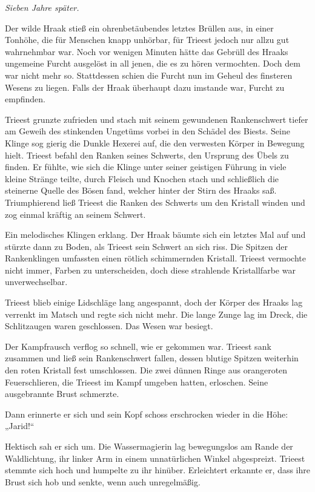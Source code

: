 
\textit{Sieben Jahre später.}\bigskip



Der wilde Hraak stieß ein ohrenbetäubendes letztes Brüllen aus, in einer Tonhöhe, die für Menschen knapp unhörbar, für Trieest jedoch nur allzu gut wahrnehmbar war. Noch vor wenigen Minuten hätte das Gebrüll des Hraaks ungemeine Furcht ausgelöst in all jenen, die es zu hören vermochten. Doch dem war nicht mehr so. Stattdessen schien die Furcht nun im Geheul des finsteren Wesens zu liegen. Falls der Hraak überhaupt dazu imstande war, Furcht zu empfinden.

Trieest grunzte zufrieden und stach mit seinem gewundenen Rankenschwert tiefer am Geweih des stinkenden Ungetüms vorbei in den Schädel des Biests. Seine Klinge sog gierig die Dunkle Hexerei auf, die den verwesten Körper in Bewegung hielt. Trieest befahl den Ranken seines Schwerts, den Ursprung des Übels zu finden. Er fühlte, wie sich die Klinge unter seiner geistigen Führung in viele kleine Stränge teilte, durch Fleisch und Knochen stach und schließlich die steinerne Quelle des Bösen fand, welcher hinter der Stirn des Hraaks saß. Triumphierend ließ Trieest die Ranken des Schwerts um den Kristall winden und zog einmal kräftig an seinem Schwert.

Ein melodisches Klingen erklang. Der Hraak bäumte sich ein letztes Mal auf und stürzte dann zu Boden, als Trieest sein Schwert an sich riss. Die Spitzen der Rankenklingen umfassten einen rötlich schimmernden Kristall. Trieest vermochte nicht immer, Farben zu unterscheiden, doch diese strahlende Kristallfarbe war unverwechselbar.

Trieest blieb einige Lidschläge lang angespannt, doch der Körper des Hraaks lag verrenkt im Matsch und regte sich nicht mehr. Die lange Zunge lag im Dreck, die Schlitzaugen waren geschlossen. Das Wesen war besiegt.

Der Kampfrausch verflog so schnell, wie er gekommen war. Trieest sank zusammen und ließ sein Rankenschwert fallen, dessen blutige Spitzen weiterhin den roten Kristall fest umschlossen. Die zwei dünnen Ringe aus orangeroten Feuerschlieren, die Trieest im Kampf umgeben hatten, erloschen. Seine ausgebrannte Brust schmerzte.

Dann erinnerte er sich und sein Kopf schoss erschrocken wieder in die Höhe: „Jarid!“

Hektisch sah er sich um. Die Wassermagierin lag bewegungslos am Rande der Waldlichtung, ihr linker Arm in einem unnatürlichen Winkel abgespreizt. Trieest stemmte sich hoch und humpelte zu ihr hinüber. Erleichtert erkannte er, dass ihre Brust sich hob und senkte, wenn auch unregelmäßig.

